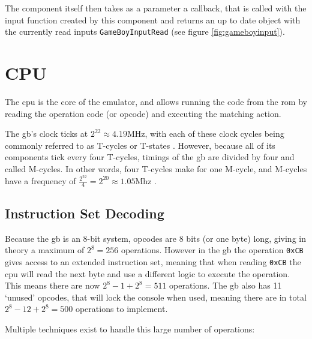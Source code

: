 \documentclass[11pt]{informatics-report}
\begin{document}
The component itself then takes as a parameter a callback, that is called with the input function created by this component and returns an up to date object with the currently read inputs \texttt{GameBoyInputRead} (see figure \ref{fig:gameboyinput}).

\section{CPU}

The \gls{cpu} is the core of the emulator, and allows running the code from the \gls{rom} by reading the operation code (or opcode) and executing the matching action.

The \glsdesc{gb}'s clock ticks at $2^{22}\approx 4.19$MHz, with each of these clock cycles being commonly referred to as T-cycles or T-states \cite[CPU Instruction Set]{pandoc}. However, because all of its components tick every four T-cycles, timings of the \gls{gb} are divided by four and called M-cycles. In other words, four T-cycles make for one M-cycle, and M-cycles have a frequency of $\frac{2^{22}}{4}=2^{20}\approx 1.05$Mhz \cite{gbcpumanual}.

\subsection{Instruction Set Decoding}

Because the \glsdesc{gb} is an 8-bit system, opcodes are 8 bits (or one byte) long, giving in theory a maximum of $2^8=256$ operations. However in the \gls{gb} the operation \texttt{0xCB} gives access to an extended instruction set, meaning that when reading \texttt{0xCB} the \gls{cpu} will read the next byte and use a different logic to execute the operation. This means there are now $2^8-1+2^8=511$ operations. The \gls{gb} also has 11 `unused' opcodes, that will lock the console when used\cite[CPU Comparison with Z80]{pandoc}, meaning there are in total $2^8-12+2^8=500$ operations to implement.

Multiple techniques exist to handle this large number of operations:
\end{document}
